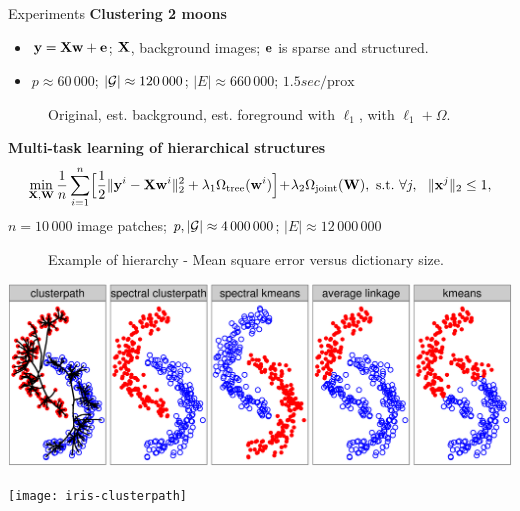 \documentclass[final]{beamer}
\begin{document}
\begin{frame}{}
\begin{columns}[T]
\begin{column}{0.315\linewidth}
\begin{block}{Experiments}
{\bfseries Clustering 2 moons}
\begin{itemize}
\item ${\mathbf y} = {\mathbf X}{\mathbf w} + {\mathbf e}$; ${\mathbf X}$, background images; ${\mathbf e}$ is sparse and structured.
\item $p \approx 60\,000$; $|{\mathcal G}| \approx 120\,000$; $|E| \approx 660\,000$; $1.5sec / \text{prox}$
\end{itemize}
   \begin{figure}
      \centering
    \caption{{\small Original, est. background, est. foreground with $\ell_1$, with $\ell_1+\Omega$.}}
   \end{figure}
\vspace*{-0.3cm}
{\bfseries Multi-task learning of hierarchical structures}
   \begin{displaymath}
    \min_{\X,\W}
    \frac{1}{n}\sum_{i=1}^n\!\Big[\frac{1}{2} \|\y^i-\X\w^i\|_2^2 + \lambda_1 \Omega_{\text{tree}}(\w^i)\Big]\!+\!\lambda_2\Omega_{\text{joint}}(\W),\ \text{s.t.}\
    \forall j,~~\|\x^j\|_2\leq 1, 
\end{displaymath}
$n=10\,000$ image patches; $p,|{\mathcal G}| \approx 4\,000\,000$; $|E|\approx 12\,000\,000$
\begin{figure}[hbtp]
   \centering
   \caption{Example of hierarchy - Mean square error versus dictionary size. 
   } \label{fig:tree}
\end{figure}
\end{block}
\includegraphics[width=0.3\paperwidth]{moons}

\texttt{[image: iris-clusterpath]}
{\small

}


\end{column}
\end{columns}

\end{frame}
\end{document}

